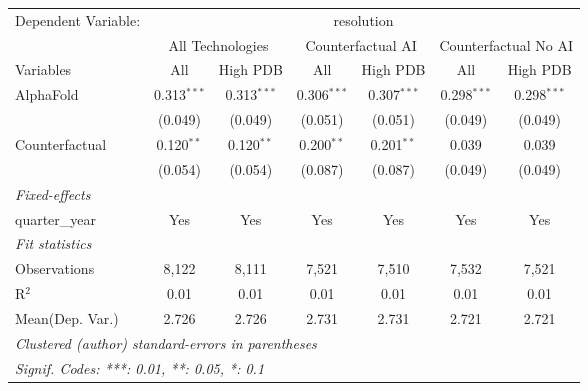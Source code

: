 \begingroup
\centering
\begin{tabular}{lcccccc}
   \tabularnewline \midrule \midrule
   Dependent Variable: & \multicolumn{6}{c}{resolution}\\
 & \multicolumn{2}{c}{All Technologies} & \multicolumn{2}{c}{Counterfactual AI} & \multicolumn{2}{c}{Counterfactual No AI} \\
\cmidrule(lr){1-1}\cmidrule(lr){2-3} \cmidrule(lr){4-5} \cmidrule(lr){6-7}
Variables & \multicolumn{1}{c}{All} & \multicolumn{1}{c}{High PDB} & \multicolumn{1}{c}{All} & \multicolumn{1}{c}{High PDB} & \multicolumn{1}{c}{All} & \multicolumn{1}{c}{High PDB} \\
\cmidrule(lr){1-1}\cmidrule(lr){2-2} \cmidrule(lr){3-3} \cmidrule(lr){4-4} \cmidrule(lr){5-5} \cmidrule(lr){6-6} \cmidrule(lr){7-7}
   AlphaFold      & 0.313$^{***}$ & 0.313$^{***}$ & 0.306$^{***}$ & 0.307$^{***}$ & 0.298$^{***}$ & 0.298$^{***}$\\   
                  & (0.049)       & (0.049)       & (0.051)       & (0.051)       & (0.049)       & (0.049)\\   
   Counterfactual & 0.120$^{**}$  & 0.120$^{**}$  & 0.200$^{**}$  & 0.201$^{**}$  & 0.039         & 0.039\\   
                  & (0.054)       & (0.054)       & (0.087)       & (0.087)       & (0.049)       & (0.049)\\   
   \midrule
   \emph{Fixed-effects}\\
   quarter\_year  & Yes           & Yes           & Yes           & Yes           & Yes           & Yes\\  
   \midrule
   \emph{Fit statistics}\\
   Observations   & 8,122         & 8,111         & 7,521         & 7,510         & 7,532         & 7,521\\  
   R$^2$          & 0.01          & 0.01          & 0.01          & 0.01          & 0.01          & 0.01\\  
Mean(Dep. Var.) & 2.726 & 2.726 & 2.731 & 2.731 & 2.721 & 2.721 \\
   \midrule \midrule
   \multicolumn{7}{l}{\emph{Clustered (author) standard-errors in parentheses}}\\
   \multicolumn{7}{l}{\emph{Signif. Codes: ***: 0.01, **: 0.05, *: 0.1}}\\
\end{tabular}
\par\endgroup
